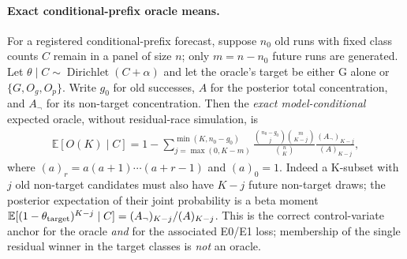 \paragraph{Exact conditional-prefix oracle means.}
For a registered conditional-prefix forecast, suppose $n_0$ old
runs with fixed class counts $C$ remain in a panel of size $n$;
only $m=n-n_0$ future runs are generated. Let
$\theta\mid C\sim\operatorname{Dirichlet}(C+\alpha)$ and let the
oracle's target be either G alone or $\{G,O_g,O_p\}$.
Write $g_0$ for old successes, $A$ for the posterior total
concentration, and $A_{\neg}$ for its non-target concentration.
Then the \emph{exact model-conditional} expected oracle, without
residual-race simulation, is
\begin{align}\label{eq:suppl-S3-prefix-oracle}
 \mathbb E[O(K)\mid C]
 =1-\sum_{j=\max(0,K-m)}^{\min(K,n_0-g_0)}
 \frac{\binom{n_0-g_0}{j}\binom{m}{K-j}}{\binom nK}
 \frac{(A_{\neg})_{K-j}}{(A)_{K-j}},
\end{align}
where $(a)_r=a(a+1)\cdots(a+r-1)$ and $(a)_0=1$.
Indeed a K-subset with $j$ old non-target candidates must also have
$K-j$ future non-target draws; the posterior expectation of their
joint probability is a beta moment
$\mathbb E[(1-\theta_{\rm target})^{K-j}\mid C]
 =(A_{\neg})_{K-j}/(A)_{K-j}$.
This is the correct control-variate anchor for the oracle \emph{and}
for the associated E0/E1 loss; membership of the single residual
winner in the target classes is \emph{not} an oracle.

